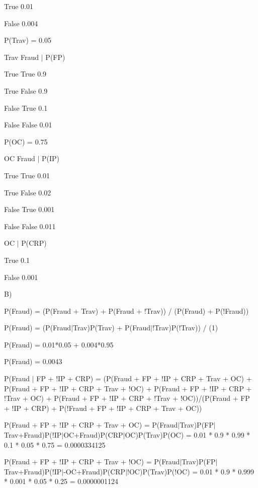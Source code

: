 \documentclass{article}
\begin{document}
True	  0.01

False  0.004

\hspace{5mm}

P(Trav) = 0.05

\hspace{5mm}

Trav  Fraud $|$ P(FP)

True  True	      0.9

True	 False    0.9

False  True     0.1

False  False   0.01

\hspace{5mm}

P(OC) = 0.75

\hspace{5mm}

OC		Fraud $|$	P(IP)

True	True	0.01

True	False	0.02

False	True	0.001

False	False	0.011

\hspace{5mm}

OC 	$|$ 	P(CRP)

True	0.1

False	0.001

\hspace{5mm}

B)

	P(Fraud) = (P(Fraud + Trav) + P(Fraud + !Trav)) / (P(Fraud) + P(!Fraud))
	
	P(Fraud) = (P(Fraud$|$Trav)P(Trav) + P(Fraud$|$!Trav)P(!Trav)) / (1)
	
	P(Fraud) = 0.01*0.05 + 0.004*0.95
	
	P(Fraud) = 0.0043
	
	P(Fraud $|$ FP + !IP + CRP) = (P(Fraud + FP + !IP + CRP + Trav + OC) + P(Fraud + FP + !IP + CRP + Trav + !OC) + P(Fraud + FP + !IP + CRP + !Trav + OC) + P(Fraud + FP + !IP + CRP + !Trav + !OC))/(P(Fraud + FP + !IP + CRP) + P(!Fraud + FP + !IP + CRP + Trav + OC))
	
	P(Fraud + FP + !IP + CRP + Trav + OC) = P(Fraud$|$Trav)P(FP$|$Trav+Fraud)P(!IP$|$OC+Fraud)P(CRP$|$OC)P(Trav)P(OC) = 0.01 * 0.9 * 0.99 * 0.1 * 0.05 * 0.75 = 0.0000334125
	
	P(Fraud + FP + !IP + CRP + Trav + !OC) = P(Fraud$|$Trav)P(FP$|$Trav+Fraud)P(!IP$|$-OC+Fraud)P(CRP$|$!OC)P(Trav)P(!OC) = 0.01 * 0.9 * 0.999 * 0.001 * 0.05 * 0.25 = 0.0000001124
	
\end{document}
